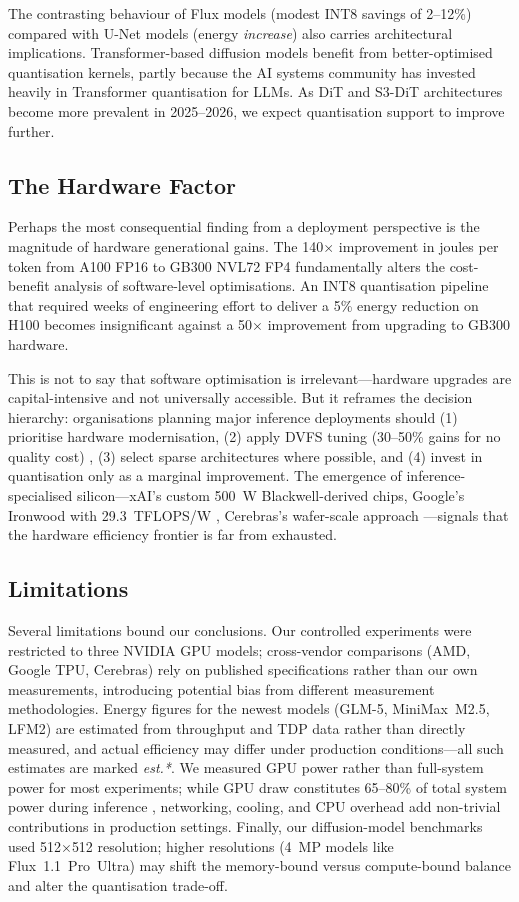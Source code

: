 \documentclass[AMS,STIX2COL]{WileyNJD-v2}
\begin{document}
The contrasting behaviour of Flux models (modest INT8 savings of 2--12\%) compared with U-Net models (energy \textit{increase}) also carries architectural implications. Transformer-based diffusion models benefit from better-optimised quantisation kernels, partly because the AI systems community has invested heavily in Transformer quantisation for LLMs. As DiT and S3-DiT architectures become more prevalent in 2025--2026, we expect quantisation support to improve further.

\subsection{The Hardware Factor}

Perhaps the most consequential finding from a deployment perspective is the magnitude of hardware generational gains. The 140$\times$ improvement in joules per token from A100 FP16 to GB300 NVL72 FP4 \cite{nvidia2025gb300} fundamentally alters the cost-benefit analysis of software-level optimisations. An INT8 quantisation pipeline that required weeks of engineering effort to deliver a 5\% energy reduction on H100 becomes insignificant against a 50$\times$ improvement from upgrading to GB300 hardware.

This is not to say that software optimisation is irrelevant---hardware upgrades are capital-intensive and not universally accessible. But it reframes the decision hierarchy: organisations planning major inference deployments should (1) prioritise hardware modernisation, (2) apply DVFS tuning (30--50\% gains for no quality cost) \cite{maliakel2025dvfs}, (3) select sparse architectures where possible, and (4) invest in quantisation only as a marginal improvement. The emergence of inference-specialised silicon---xAI's custom 500~W Blackwell-derived chips, Google's Ironwood with 29.3~TFLOPS/W \cite{google2025ironwood}, Cerebras's wafer-scale approach \cite{cerebras2024cs3}---signals that the hardware efficiency frontier is far from exhausted.

\subsection{Limitations}

Several limitations bound our conclusions. Our controlled experiments were restricted to three NVIDIA GPU models; cross-vendor comparisons (AMD, Google TPU, Cerebras) rely on published specifications rather than our own measurements, introducing potential bias from different measurement methodologies. Energy figures for the newest models (GLM-5, MiniMax~M2.5, LFM2) are estimated from throughput and TDP data rather than directly measured, and actual efficiency may differ under production conditions---all such estimates are marked \textit{est.*}. We measured GPU power rather than full-system power for most experiments; while GPU draw constitutes 65--80\% of total system power during inference \cite{yang2025system}, networking, cooling, and CPU overhead add non-trivial contributions in production settings. Finally, our diffusion-model benchmarks used 512$\times$512 resolution; higher resolutions (4~MP models like Flux~1.1~Pro~Ultra) may shift the memory-bound versus compute-bound balance and alter the quantisation trade-off.
\end{document}
